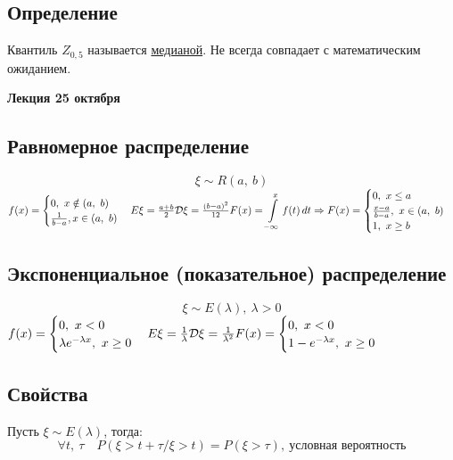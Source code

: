 \documentclass[12pt, a4paper]{article}
\begin{document}
    \subsection*{Определение}
    
    Квантиль $Z_{0,5}$ называется \underline{медианой}. Не всегда совпадает с математическим ожиданием.
    
    \begin{center}
        \bf Лекция 25 октября
    \end{center}
    \subsection*{Равномерное распределение}
    \[\xi\sim R(a,\ b)\]
    $f(x) = \begin{cases}
        0,\ x\notin (a,\ b)\\
        \frac{1}{b - a}, x\in(a,\ b)
    \end{cases}\\
    E\xi = \frac{a + b}{2}\\
    \mathcal{D}\xi = \frac{(b - a)^2}{12}\\
    F(x) = \displaystyle \int\limits_{-\infty}^{x} f(t)\, dt\Rightarrow F(x) = \begin{cases}
        0,\ x\leq a\\
        \frac{x - a}{b - a},\ x\in (a,\ b)\\
        1,\ x\geq b
    \end{cases}$
    \subsection*{Экспоненциальное (показательное) распределение}
    \[\xi \sim E(\lambda),\ \lambda > 0\]
    $f(x) = \begin{cases}
        0,\ x < 0\\
        \lambda e^{-\lambda x},\ x\geq 0
    \end{cases}\\
    E\xi = \frac{1}{\lambda}\\
    \mathcal{D}\xi = \frac{1}{\lambda^2}\\
    F(x) = \begin{cases}
        0,\ x < 0\\
        1 - e^{-\lambda x},\ x\geq 0
    \end{cases}$
    \subsection*{Свойства}
    Пусть $\xi \sim E(\lambda)$, тогда:
    \[\forall t,\ \tau\quad P(\xi > t + \tau / \xi > t) = P(\xi > \tau),\ \text{условная вероятность}\]
\end{document}

